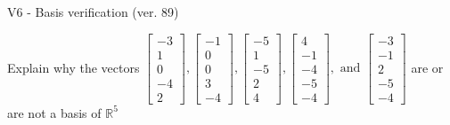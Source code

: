 \begin{exercise}
  \begin{exerciseTitle}V6 - Basis verification (ver. 89)\end{exerciseTitle}
  \begin{exerciseStatement}
    Explain why the vectors \(\left[\begin{array}{r}
-3 \\
1 \\
0 \\
-4 \\
2
\end{array}\right] , \left[\begin{array}{r}
-1 \\
0 \\
0 \\
3 \\
-4
\end{array}\right] , \left[\begin{array}{r}
-5 \\
1 \\
-5 \\
2 \\
4
\end{array}\right] , \left[\begin{array}{r}
4 \\
-1 \\
-4 \\
-5 \\
-4
\end{array}\right] , \text{ and } \left[\begin{array}{r}
-3 \\
-1 \\
2 \\
-5 \\
-4
\end{array}\right]\) are or are not a basis of \(\mathbb{R}^5\)	



\end{exerciseStatement}
\end{exercise}
